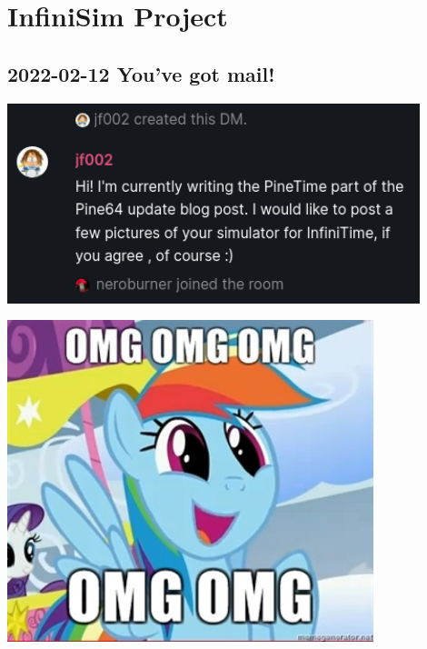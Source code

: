 \documentclass{beamer}
\begin{document}
\section{InfiniSim Project}

\subsection{2022-02-12 You've got mail!}
\begin{frame}{}

  \centering\includegraphics[width=0.9\textwidth]{../2022-02-12_jf002_matrix}

\end{frame}

\begin{frame}{}

  \centering\includegraphics[width=0.8\textwidth]{../pony_rainbow_omg_omg}

\end{frame}
\end{document}
